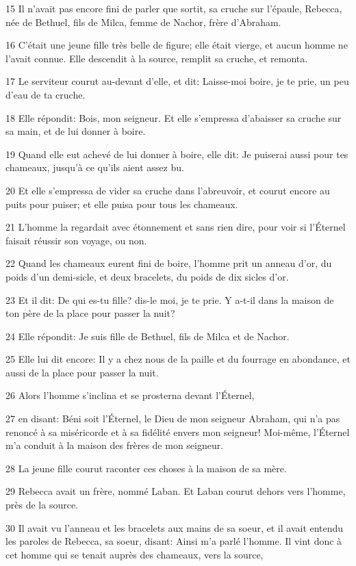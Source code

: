 \par 15 Il n'avait pas encore fini de parler que sortit, sa cruche sur l'épaule, Rebecca, née de Bethuel, fils de Milca, femme de Nachor, frère d'Abraham.
\par 16 C'était une jeune fille très belle de figure; elle était vierge, et aucun homme ne l'avait connue. Elle descendit à la source, remplit sa cruche, et remonta.
\par 17 Le serviteur courut au-devant d'elle, et dit: Laisse-moi boire, je te prie, un peu d'eau de ta cruche.
\par 18 Elle répondit: Bois, mon seigneur. Et elle s'empressa d'abaisser sa cruche sur sa main, et de lui donner à boire.
\par 19 Quand elle eut achevé de lui donner à boire, elle dit: Je puiserai aussi pour tes chameaux, jusqu'à ce qu'ils aient assez bu.
\par 20 Et elle s'empressa de vider sa cruche dans l'abreuvoir, et courut encore au puits pour puiser; et elle puisa pour tous les chameaux.
\par 21 L'homme la regardait avec étonnement et sans rien dire, pour voir si l'Éternel faisait réussir son voyage, ou non.
\par 22 Quand les chameaux eurent fini de boire, l'homme prit un anneau d'or, du poids d'un demi-sicle, et deux bracelets, du poids de dix sicles d'or.
\par 23 Et il dit: De qui es-tu fille? dis-le moi, je te prie. Y a-t-il dans la maison de ton père de la place pour passer la nuit?
\par 24 Elle répondit: Je suis fille de Bethuel, fils de Milca et de Nachor.
\par 25 Elle lui dit encore: Il y a chez nous de la paille et du fourrage en abondance, et aussi de la place pour passer la nuit.
\par 26 Alors l'homme s'inclina et se prosterna devant l'Éternel,
\par 27 en disant: Béni soit l'Éternel, le Dieu de mon seigneur Abraham, qui n'a pas renoncé à sa miséricorde et à sa fidélité envers mon seigneur! Moi-même, l'Éternel m'a conduit à la maison des frères de mon seigneur.
\par 28 La jeune fille courut raconter ces choses à la maison de sa mère.
\par 29 Rebecca avait un frère, nommé Laban. Et Laban courut dehors vers l'homme, près de la source.
\par 30 Il avait vu l'anneau et les bracelets aux mains de sa soeur, et il avait entendu les paroles de Rebecca, sa soeur, disant: Ainsi m'a parlé l'homme. Il vint donc à cet homme qui se tenait auprès des chameaux, vers la source,
